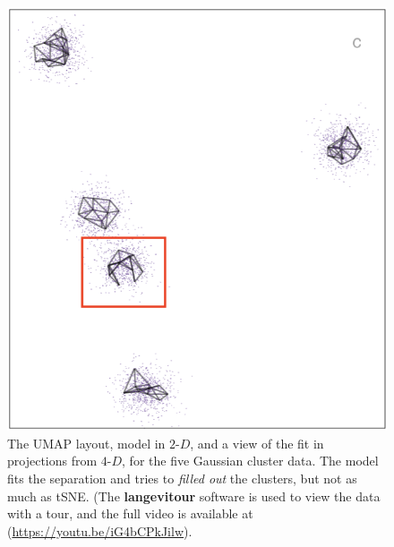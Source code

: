 \documentclass[
  12pt]{article}
\newcommand\gD{$2\text{-}D$}
\begin{document}
\begin{figure}[H]
%
\begin{minipage}{0.33\linewidth}
\includegraphics{figures/five_gau_clusters/sc_umap_3.png}\end{minipage}%

\caption{\label{fig-gau-umap-sc}The UMAP layout, model in \gD{}, and a
view of the fit in projections from \(4\text{-}D\), for the five
Gaussian cluster data. The model fits the separation and tries to
\emph{filled out} the clusters, but not as much as tSNE. (The
\textbf{langevitour} software is used to view the data with a tour, and
the full video is available at (\url{https://youtu.be/iG4bCPkJilw}).}

\end{figure}%
\end{document}
